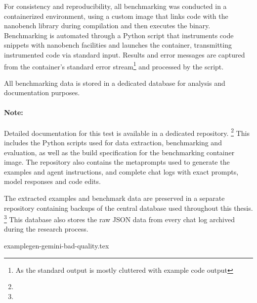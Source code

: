 For consistency and reproducibility, all benchmarking was conducted in a containerized environment, using a custom image that links code with the nanobench library \cite{nanobench} during compilation and then executes the binary.
Benchmarking is automated through a Python script that instruments code snippets with nanobench facilities and launches the container, transmitting instrumented code via standard input.
Results and error messages are captured from the container's standard error stream\footnote{%
  As the standard output is mostly cluttered with example code output
}
and processed by the script.

All benchmarking data is stored in a dedicated database for analysis and documentation purposes.

\paragraph{Note:}
Detailed documentation for this test is available in a dedicated repository.%
\footnote{}
This includes the Python scripts used for data extraction, benchmarking and evaluation, as well as the build specification for the benchmarking container image.
The repository also contains the metaprompts used to generate the examples and agent instructions, and complete chat logs with exact prompts, model responses and code edits.

The extracted examples and benchmark data are preserved in a separate repository containing backups of the central database used throughout this thesis.%
\footnote{}
This database also stores the raw JSON data from every chat log archived during the research process.

\begin{lstbox}{%
    \label{lst:examplegen-gemini-bad-quality}
  }
  {examplegen-gemini-bad-quality.tex}
\end{lstbox}%
